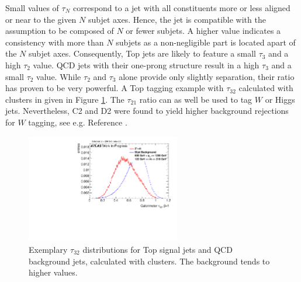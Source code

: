 Small values of $\tau_N$ correspond to a jet with all constituents more or less aligned or near to the given $N$ subjet axes. Hence, the jet is compatible with the assumption to be composed of $N$ or fewer subjets. A higher value indicates a consistency with more than $N$ subjets as a non-negligible part is located apart of the $N$ subjet axes. Consequently, Top jets are likely to feature a small $\tau_3$ and a high $\tau_2$ value. QCD jets with their one-prong structure result in a high $\tau_{3}$ and a small $\tau_{2}$ value. While $\tau_2$ and $\tau_3$ alone provide only slightly separation, their ratio has proven to be very powerful. A Top tagging example with $\tau_{32}$ calculated with clusters in given in Figure \ref{fig:nSub_example}. The $\tau_{21}$ ratio can as well be used to tag $W$ or Higgs jets. Nevertheless, C2 and D2 were found to yield higher background rejections for $W$ tagging, see e.g. Reference \cite{bib:w_tagging}. 
\begin{figure}
\centering
\includegraphics[width=0.6\textwidth]{sascha_input/plots/Top/Beta1/h_recoJet_nSub32_bin3.pdf}
\caption{Exemplary $\tau_{32}$ distributions for Top signal jets and QCD background jets, calculated with clusters. The background tends to higher values.}\label{fig:nSub_example}
\end{figure}


